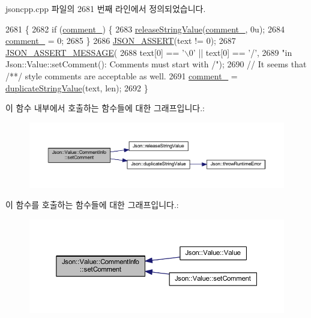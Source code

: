 jsoncpp.\+cpp 파일의 2681 번째 라인에서 정의되었습니다.


\begin{DoxyCode}
2681                                                               \{
2682   \textcolor{keywordflow}{if} (\hyperlink{struct_json_1_1_value_1_1_comment_info_a020f19c7098bab8ec8fec14cd1a5afb9}{comment\_}) \{
2683     \hyperlink{namespace_json_a3e0d81d514d0e8bddf33b08074214abd}{releaseStringValue}(\hyperlink{struct_json_1_1_value_1_1_comment_info_a020f19c7098bab8ec8fec14cd1a5afb9}{comment\_}, 0u);
2684     \hyperlink{struct_json_1_1_value_1_1_comment_info_a020f19c7098bab8ec8fec14cd1a5afb9}{comment\_} = 0;
2685   \}
2686   \hyperlink{json_8h_a188941dcc789ccb6539c3d6f41405582}{JSON\_ASSERT}(text != 0);
2687   \hyperlink{json_8h_ad7facdeeca0f495765e3b204c265eadb}{JSON\_ASSERT\_MESSAGE}(
2688       text[0] == \textcolor{charliteral}{'\(\backslash\)0'} || text[0] == \textcolor{charliteral}{'/'},
2689       \textcolor{stringliteral}{"in Json::Value::setComment(): Comments must start with /"});
2690   \textcolor{comment}{// It seems that /**/ style comments are acceptable as well.}
2691   \hyperlink{struct_json_1_1_value_1_1_comment_info_a020f19c7098bab8ec8fec14cd1a5afb9}{comment\_} = \hyperlink{namespace_json_a678ac3a60cd70ec0fb4c9abfd40eb0c4}{duplicateStringValue}(text, len);
2692 \}
\end{DoxyCode}
이 함수 내부에서 호출하는 함수들에 대한 그래프입니다.\+:\nopagebreak
\begin{figure}[H]
\begin{center}
\leavevmode
\includegraphics[width=350pt]{struct_json_1_1_value_1_1_comment_info_a4d01c2cd8c07995969c5d636dfd4fa8c_cgraph}
\end{center}
\end{figure}
이 함수를 호출하는 함수들에 대한 그래프입니다.\+:
\nopagebreak
\begin{figure}[H]
\begin{center}
\leavevmode
\includegraphics[width=350pt]{struct_json_1_1_value_1_1_comment_info_a4d01c2cd8c07995969c5d636dfd4fa8c_icgraph}
\end{center}
\end{figure}


